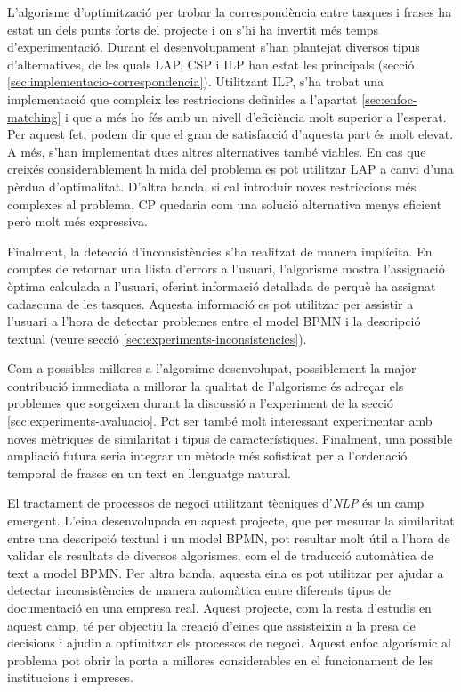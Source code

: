 L'algorisme d'optimització per trobar la correspondència entre tasques i frases ha estat un dels punts forts del projecte i on s'hi ha invertit més temps d'experimentació. Durant el desenvolupament s'han plantejat diversos tipus d'alternatives, de les quals LAP, CSP i ILP han estat les principals (secció \ref{sec:implementacio-correspondencia}). Utilitzant ILP, s'ha trobat una implementació que compleix les restriccions definides a l'apartat \ref{sec:enfoc-matching} i que a més ho fés amb un nivell d'eficiència molt superior a l'esperat. Per aquest fet, podem dir que el grau de satisfacció d'aquesta part és molt elevat. A més, s'han implementat dues altres alternatives també viables. En cas que creixés considerablement la mida del problema es pot utilitzar LAP a canvi d'una pèrdua d'optimalitat. D'altra banda, si cal introduir noves restriccions més complexes al problema, CP quedaria com una solució alternativa menys eficient però molt més expressiva.

Finalment, la detecció d'inconsistències s'ha realitzat de manera implícita. En comptes de retornar una llista d'errors a l'usuari, l'algorisme mostra l'assignació òptima calculada a l'usuari, oferint informació detallada de perquè ha assignat cadascuna de les tasques. Aquesta informació es pot utilitzar per assistir a l'usuari a l'hora de detectar problemes entre el model BPMN i la descripció textual (veure secció \ref{sec:experiments-inconsistencies}). 

Com a possibles millores a l'algorsime desenvolupat, possiblement la major contribució immediata a millorar la qualitat de l'algorisme és adreçar els problemes que sorgeixen durant la discussió a l'experiment de la secció \ref{sec:experiments-avaluacio}. Pot ser també molt interessant experimentar amb noves mètriques de similaritat i tipus de característiques. Finalment, una possible ampliació futura seria integrar un mètode més sofisticat per a l'ordenació temporal de frases en un text en llenguatge natural.

El tractament de processos de negoci utilitzant tècniques d'\emph{NLP} és un camp emergent. L'eina desenvolupada en aquest projecte, que per mesurar la similaritat entre una descripció textual i un model BPMN, pot resultar molt útil a l'hora de validar els resultats de diversos algorismes, com el de traducció automàtica de text a model BPMN. Per altra banda, aquesta eina es pot utilitzar per ajudar a detectar inconsistències de manera automàtica entre diferents tipus de documentació en una empresa real.  Aquest projecte, com la resta d'estudis en aquest camp, té per objectiu la creació d'eines que assisteixin a la presa de decisions i ajudin a optimitzar els processos de negoci. Aquest enfoc algorísmic al problema pot obrir la porta a millores considerables en el funcionament de les institucions i empreses.
